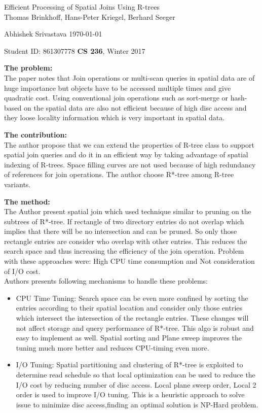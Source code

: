 \documentclass[a4paper,12pt, twoside]{article}
\renewcommand{\maketitle}{%
 	\Large
 	\begin{center}
 	Efficient Processing of Spatial Joins Using R-trees \\	
 	\normalsize Thomas Brinkhoff, Hans-Peter Kriegel, Berhard Seeger
 	\end{center}
 
 	\Large
	Abhishek Srivastava
	\hfill
	\normalsize
	\today
 	\par
 	Student ID: 861307778
 	\hfill
 	\textbf{CS 236}, Winter 2017
 	\par 	
 	\hrulefill
 	\par
 	}
\begin{document}
\thispagestyle{empty}
	
\maketitle

\textbf{The problem:}\\
The paper notes that Join operations or multi-scan queries in spatial data are of huge importance but objects have to be accessed multiple times and give quadratic cost. Using conventional join operations such as sort-merge or hash-based on the spatial data are also not efficient because of high disc access and they loose locality information which is very important in spatial data. 

\textbf{The contribution:}\\
The author propose that we can extend the properties of R-tree class to support spatial join queries and do it in an efficient way by taking advantage of spatial indexing of R-trees. Space filling curves are not used because of high redundancy of references for join operations. The author choose R*-tree among R-tree variants.

\textbf{The method:}\\
The Author present spatial join which used technique similar to pruning on the subtrees of R*-tree. If rectangle of two directory entries do not overlap which implies that there will be no intersection and can be pruned. So only those rectangle entries are consider who overlap with other entries. This reduces the search space and thus increasing the efficiency of the join operation. Problem with these approaches were: High CPU time consumption and Not consideration of I/O cost.\\

Authors presents following mechanisms to handle these problems:
\begin{itemize}
	\item CPU Time Tuning: Search space can be even more confined by sorting the entries according to their spatial location and consider only those entries which intersect the intersection of the rectangle entries. These changes will not affect storage and query performance of R*-tree. This algo is robust and easy to implement as well. Spatial sorting and Plane sweep improves the tuning much more better and reduces CPU-timing even more. 
	\item I/O Tuning: Spatial partitioning and clustering of R*-tree is exploited to determine read schedule so that local optimization can be used to reduce the I/O cost by reducing number of disc access. Local plane sweep order, Local 2 order is used to improve I/O tuning. This is a heuristic approach to solve issue to minimize disc access,finding an optimal solution is NP-Hard problem.
\end{itemize}
\end{document}
